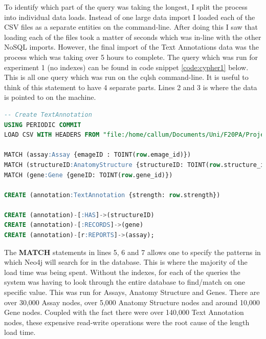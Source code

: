 To identify which part of the query was taking the longest, I split the process into individual data loads. Instead of one large data import I loaded each of the CSV files as a separate entities on the command-line. After doing this I saw that loading each of the files took a matter of seconds which was in-line with the other NoSQL imports. However, the final import of the Text Annotations data was the process which was taking over 5 hours to complete. The query which was run for experiment 1 (no indexes) can be found in code snippet \ref{code:cypher1} below. This is all one query which was run on the cqlsh command-line. It is useful to think of this statement to have 4 separate parts. Lines 2 and 3 is where the data is pointed to on the machine.
\begin{lstlisting}[language=SQL, caption=Cypher file to load text annotations data into the Neo4j data model., label=code:cypher1]
-- Create TextAnnotation
USING PERIODIC COMMIT
LOAD CSV WITH HEADERS FROM "file:/home/callum/Documents/Uni/F20PA/Project/Neo4j/Data/TextAnnotations.csv" AS row

MATCH (assay:Assay {emageID : TOINT(row.emage_id)})
MATCH (structureID:AnatomyStructure {structureID: TOINT(row.structure_id)})
MATCH (gene:Gene {geneID: TOINT(row.gene_id)})

CREATE (annotation:TextAnnotation {strength: row.strength})

CREATE (annotation)-[:HAS]->(structureID)
CREATE (annotation)-[:RECORDS]->(gene)
CREATE (annotation)-[r:REPORTS]->(assay);
\end{lstlisting}

\parindent 0pt
The \textbf{MATCH} statements in lines 5, 6 and 7 allows one to specify the patterns in which Neo4j will search for in the database. This is where the majority of the load time was being spent. Without the indexes, for each of the queries the system was having to look through the entire database to find/match on one specific value. This was run for Assays, Anatomy Structure and Genes. There are over 30,000 Assay nodes, over 5,000 Anatomy Structure nodes and around 10,000 Gene nodes. Coupled with the fact there were over 140,000 Text Annotation nodes, these expensive read-write operations were the root cause of the length load time.
\parindent 15pt
